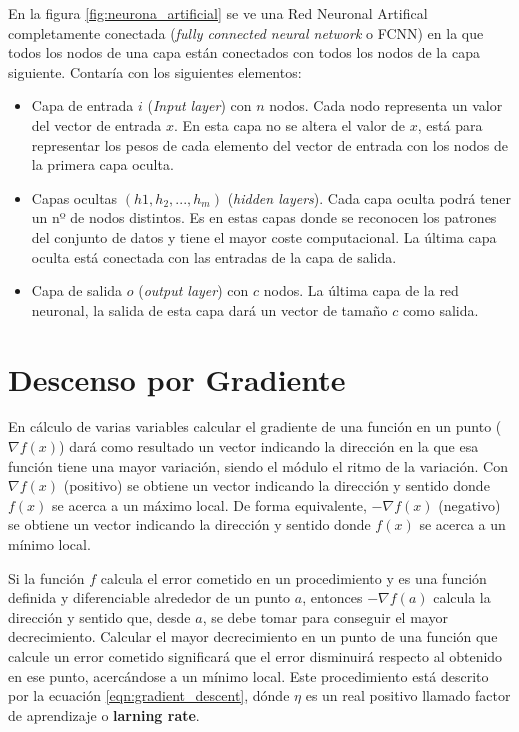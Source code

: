 En la figura \ref{fig:neurona_artificial} se ve una Red Neuronal Artifical completamente conectada (\textit{fully connected neural network} o FCNN) en la que todos los nodos de una capa están conectados con todos los nodos de la capa siguiente. Contaría con los siguientes elementos:
\begin{itemize}
\item Capa de entrada $i$ (\textit{Input layer}) con $ n $ nodos. Cada nodo representa un valor del vector de entrada $ x $. En esta capa no se altera el valor de $x$, está para representar los pesos de cada elemento del vector de entrada con los nodos de la primera capa oculta.
\item Capas ocultas $(h1, h_2, ..., h_m)$ (\textit{hidden layers}). Cada capa oculta podrá tener un nº de nodos distintos. Es en estas capas donde se reconocen los patrones del conjunto de datos y tiene el mayor coste computacional. La última capa oculta está conectada con las entradas de la capa de salida.
\item Capa de salida $o$ (\textit{output layer}) con $c$ nodos. La última capa de la red neuronal, la salida de esta capa dará un vector de tamaño $c$ como salida.
\end{itemize}

\section{Descenso por Gradiente }\label{sec:gradient_descent}

En cálculo de varias variables calcular el gradiente de una función en un punto ($\nabla f(x)$) dará como resultado un vector indicando la dirección en la que esa función tiene una mayor variación, siendo el módulo el ritmo de la variación. Con $\nabla f(x)$ (positivo) se obtiene un vector indicando la dirección y sentido donde $f(x)$ se acerca a un máximo local. De forma equivalente, $-\nabla f(x)$ (negativo) se obtiene un vector indicando la dirección y sentido donde $f(x)$ se acerca a un mínimo local.

Si la función $f$ calcula el error cometido en un procedimiento y es una función definida y diferenciable alrededor de un punto $a$, entonces $-\nabla f(a)$ calcula la dirección y sentido que, desde $a$, se debe tomar para conseguir el mayor decrecimiento. Calcular el mayor decrecimiento en un punto de una función que calcule un error cometido significará que el error disminuirá respecto al obtenido en ese punto, acercándose a un mínimo local. Este procedimiento está descrito por la ecuación \ref{eqn:gradient_descent}, dónde $\eta$ es un real positivo llamado factor de aprendizaje o \textbf{larning rate}.

